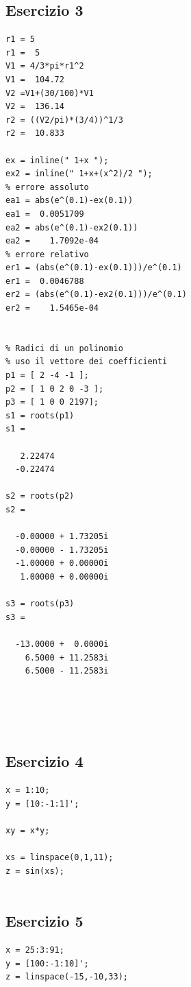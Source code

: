 \documentclass{article}
\newcommand{\vs}{\vspace*{1.0cm}}
\begin{document}
\vs
\subsection{ Esercizio 3}
\begin{lstlisting}
r1 = 5
r1 =  5
V1 = 4/3*pi*r1^2 
V1 =  104.72
V2 =V1+(30/100)*V1
V2 =  136.14
r2 = ((V2/pi)*(3/4))^1/3
r2 =  10.833

ex = inline(" 1+x ");
ex2 = inline(" 1+x+(x^2)/2 ");
% errore assoluto
ea1 = abs(e^(0.1)-ex(0.1))
ea1 =  0.0051709
ea2 = abs(e^(0.1)-ex2(0.1))
ea2 =    1.7092e-04
% errore relativo
er1 = (abs(e^(0.1)-ex(0.1)))/e^(0.1)
er1 =  0.0046788
er2 = (abs(e^(0.1)-ex2(0.1)))/e^(0.1)
er2 =    1.5465e-04


% Radici di un polinomio
% uso il vettore dei coefficienti
p1 = [ 2 -4 -1 ];
p2 = [ 1 0 2 0 -3 ];
p3 = [ 1 0 0 2197];
s1 = roots(p1)
s1 =

   2.22474
  -0.22474

s2 = roots(p2)
s2 =

  -0.00000 + 1.73205i
  -0.00000 - 1.73205i
  -1.00000 + 0.00000i
   1.00000 + 0.00000i

s3 = roots(p3)
s3 =

  -13.0000 +  0.0000i
    6.5000 + 11.2583i
    6.5000 - 11.2583i





\end{lstlisting}


\vs
\subsection{ Esercizio 4}
\begin{lstlisting}
x = 1:10;
y = [10:-1:1]';

xy = x*y;

xs = linspace(0,1,11);
z = sin(xs);


\end{lstlisting}


\vs
\subsection{ Esercizio 5}
\begin{lstlisting}
x = 25:3:91;
y = [100:-1:10]';
z = linspace(-15,-10,33);

\end{lstlisting}
\end{document}
